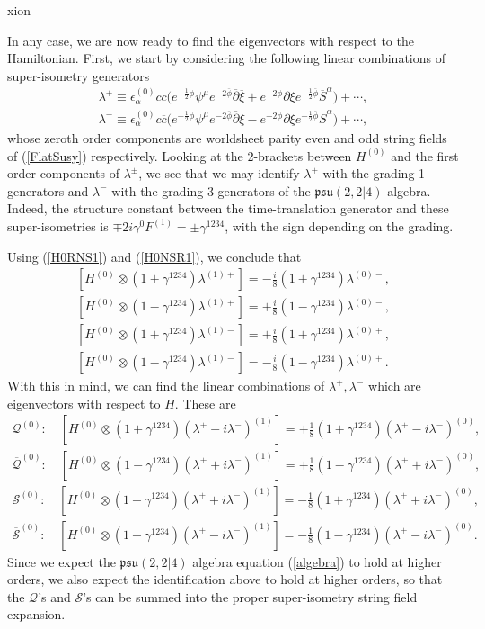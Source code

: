 xion\documentclass[12pt]{article}
\def\ie{\begin{equation}\begin{aligned}}
\def\fe{\end{aligned}\end{equation}}
\numberwithin{equation}{section}
\newcommand{\B}[1]{\overline{#1}}
\begin{document}
In any case, we are now ready to find the eigenvectors with respect to the Hamiltonian. First, we start by considering the following linear combinations of super-isometry generators
\ie
    \lambda^+\equiv\epsilon^{(0)}_{\alpha}c\B{c}\big(e^{-\frac{1}{2}\phi}\psi^{\mu}e^{-2\B{\phi}}\B{\partial}\B{\xi}+e^{-2\phi}\partial\xi e^{-\frac{1}{2}\B{\phi}}\B{S}^{\alpha}\big)+\cdots,\\
    \lambda^-\equiv\epsilon^{(0)}_{\alpha}c\B{c}\big(e^{-\frac{1}{2}\phi}\psi^{\mu}e^{-2\B{\phi}}\B{\partial}\B{\xi}-e^{-2\phi}\partial\xi e^{-\frac{1}{2}\B{\phi}}\B{S}^{\alpha}\big)+\cdots,
\fe
whose zeroth order components are worldsheet parity even and odd string fields of (\ref{FlatSusy}) respectively. Looking at the 2-brackets between $H^{(0)}$ and the first order components of $\lambda^{\pm}$, we see that we may identify $\lambda^+$ with the grading 1 generators and $\lambda^-$ with the grading 3 generators of the $\mathfrak{psu}(2,2|4)$ algebra. Indeed, the structure constant between the time-translation generator and these super-isometries is $\mp2i\gamma^{0}F^{(1)}=\pm \gamma^{1234}$, with the sign depending on the grading.

Using (\ref{H0RNS1}) and (\ref{H0NSR1}), we conclude that
\ie
    [H^{(0)}\otimes(1+\gamma^{1234})\lambda^{(1)+}]=-\frac{i}{8}(1+\gamma^{1234})\lambda^{(0)-},\\
    [H^{(0)}\otimes(1-\gamma^{1234})\lambda^{(1)+}]=+\frac{i}{8}(1-\gamma^{1234})\lambda^{(0)-},\\
    [H^{(0)}\otimes(1+\gamma^{1234})\lambda^{(1)-}]=+\frac{i}{8}(1+\gamma^{1234})\lambda^{(0)+},\\
    [H^{(0)}\otimes(1-\gamma^{1234})\lambda^{(1)-}]=-\frac{i}{8}(1-\gamma^{1234})\lambda^{(0)+}.
\fe
With this in mind, we can find the linear combinations of $\lambda^+,\lambda^-$ which are eigenvectors with respect to $H$. These are
\ie
    \mathcal{Q}^{(0)}:\quad[H^{(0)}\otimes(1+\gamma^{1234})(\lambda^+-i\lambda^-)^{(1)}]=+\frac{1}{8}(1+\gamma^{1234})(\lambda^+-i\lambda^-)^{(0)},\\
    \B{\mathcal{Q}}^{(0)}:\quad [H^{(0)}\otimes(1-\gamma^{1234})(\lambda^++i\lambda^-)^{(1)}]=+\frac{1}{8}(1-\gamma^{1234})(\lambda^++i\lambda^-)^{(0)},\\
    \mathcal{S}^{(0)}:\quad [H^{(0)}\otimes(1+\gamma^{1234})(\lambda^++i\lambda^-)^{(1)}]=-\frac{1}{8}(1+\gamma^{1234})(\lambda^++i\lambda^-)^{(0)},\\
    \B{\mathcal{S}}^{(0)}:\quad [H^{(0)}\otimes(1-\gamma^{1234})(\lambda^+-i\lambda^-)^{(1)}]=-\frac{1}{8}(1-\gamma^{1234})(\lambda^+-i\lambda^-)^{(0)}.
\fe
Since we expect the $\mathfrak{psu}(2,2|4)$ algebra equation (\ref{algebra}) to hold at higher orders, we also expect the identification above to hold at higher orders, so that the $\mathcal{Q}$'s and $\mathcal{S}$'s can be summed into the proper super-isometry string field expansion.
\end{document}
